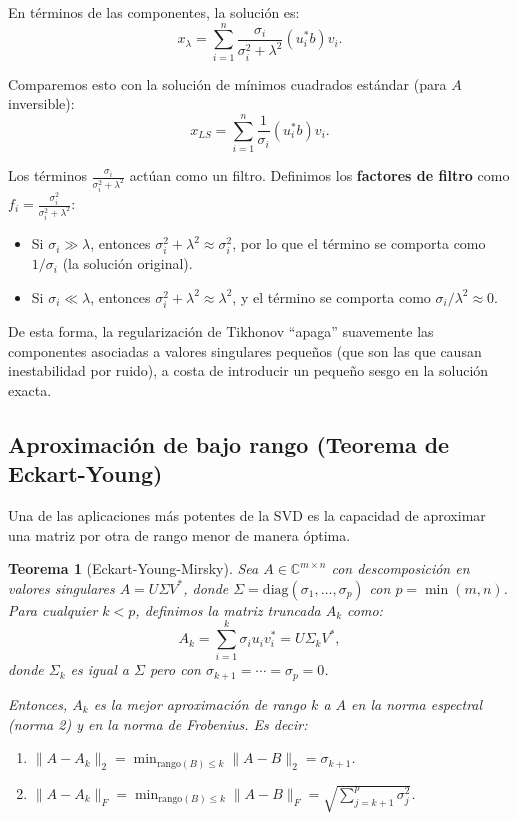 \documentclass[a4paper,11pt]{report}
\newtheorem{theorem}{Teorema}[chapter]
\begin{document}
En términos de las componentes, la solución es:
\[
x_\lambda = \sum_{i=1}^n \frac{\sigma_i}{\sigma_i^2 + \lambda^2} (u_i^* b) v_i.
\]

Comparemos esto con la solución de mínimos cuadrados estándar (para $A$ inversible):
\[
x_{LS} = \sum_{i=1}^n \frac{1}{\sigma_i} (u_i^* b) v_i.
\]

Los términos $\frac{\sigma_i}{\sigma_i^2 + \lambda^2}$ actúan como un filtro. Definimos los \textbf{factores de filtro} como $f_i = \frac{\sigma_i^2}{\sigma_i^2 + \lambda^2}$:
\begin{itemize}
\item Si $\sigma_i \gg \lambda$, entonces $\sigma_i^2 + \lambda^2 \approx \sigma_i^2$, por lo que el término se comporta como $1/\sigma_i$ (la solución original).
\item Si $\sigma_i \ll \lambda$, entonces $\sigma_i^2 + \lambda^2 \approx \lambda^2$, y el término se comporta como $\sigma_i / \lambda^2 \approx 0$.
\end{itemize}

De esta forma, la regularización de Tikhonov ``apaga'' suavemente las componentes asociadas a valores singulares pequeños (que son las que causan inestabilidad por ruido), a costa de introducir un pequeño sesgo en la solución exacta.

\subsection{Aproximación de bajo rango (Teorema de Eckart-Young)}

Una de las aplicaciones más potentes de la SVD es la capacidad de aproximar una matriz por otra de rango menor de manera óptima.

\begin{theorem}[Eckart-Young-Mirsky]
Sea $A \in \mathbb{C}^{m \times n}$ con descomposición en valores singulares $A = U \Sigma V^*$, donde $\Sigma = \text{diag}(\sigma_1, \ldots, \sigma_p)$ con $p = \min(m,n)$.
Para cualquier $k < p$, definimos la matriz truncada $A_k$ como:
\[
A_k = \sum_{i=1}^k \sigma_i u_i v_i^* = U \Sigma_k V^*,
\]
donde $\Sigma_k$ es igual a $\Sigma$ pero con $\sigma_{k+1} = \cdots = \sigma_p = 0$.

Entonces, $A_k$ es la mejor aproximación de rango $k$ a $A$ en la norma espectral (norma 2) y en la norma de Frobenius. Es decir:
\begin{enumerate}
\item $\|A - A_k\|_2 = \min_{\text{rango}(B) \leq k} \|A - B\|_2 = \sigma_{k+1}$.
\item $\|A - A_k\|_F = \min_{\text{rango}(B) \leq k} \|A - B\|_F = \sqrt{\sum_{j=k+1}^p \sigma_j^2}$.
\end{enumerate}
\end{theorem}
\end{document}

